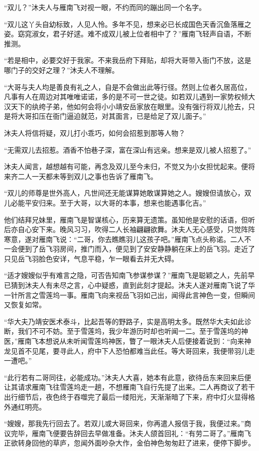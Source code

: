 “双儿？”沐夫人与雁南飞对视一眼，不约而同的蹦出同一个名字。

“双儿这丫头自幼标致，人见人怜。多年不见，想来必已长成国色天香沉鱼落雁之姿。窈窕淑女，君子好逑。难不成双儿被上位者相中了？”雁南飞轻声自语，不断推测。

“若是相中，必要交好于我家。不来我岳府下拜贴，却将大哥带入衙门不放，这是哪门子的交好之理？”沐夫人不理解。

“大哥与夫人均是善良有礼之人，自是不会做出此等行径。然则上位者久居高位，凡事有人在周边对其唯唯诺诺，多的是不可一世之徒。如若双儿遇到一家势权倾大汉天下的纨绔子弟，他如何会将小小靖安岳家放在眼里。没有强行将双儿抢去，只是将大哥扣压在衙门逼迫就范，对其面言，已是给足了双儿面子。”

沐夫人将信将疑，双儿打小乖巧，如何会招惹到那等人物？

“无需双儿去招惹。酒香不怕巷子深，富在深山有远亲。想来是双儿被人招惹了。”

沐夫人闻言，越想越有可能，再念及双儿至今未归，不觉又为小女担忧起来。便将来齐二人一天都未等到双儿之事也告诉了雁南飞。

“双儿的师尊是世外高人，凡世间还无能谋算她敢谋算她之人。嫂嫂但请放心，双儿必能平安归来。至于大哥，以大哥的本事，想来也能遇事化吉。”

他们结拜兄妹里，雁南飞是智谋核心，历来算无遗策。虽知他是安慰的话语，但听后亦自心安下来。晚风习习，吹得二人长袖翩翩欲舞。沐夫人无心感受，只觉阵阵寒意，遂对雁南飞说：“二哥，你去瞧瞧羽儿这孩子吧。”雁南飞点头称诺。二人不一会便到了岳飞羽房间，推门而入，便见到了安安静静躺在床上的岳飞羽。走近了只见岳飞羽脸色安详，气息平稳，乍一眼看去并无大碍。

“适才嫂嫂似乎有难言之隐，可否告知南飞参谋参谋？”雁南飞是聪颖之人，先前早已猜到沐夫人有未尽之言，心中疑惑，直到此刻才提起。沐夫人遂对雁南飞说了华一针所言之雪莲坞一事。雁南飞向来视岳飞羽如己出，闻得此言神色一变，但瞬间又恢复如常。

“华大夫乃靖安医术泰斗，比起吾等的野路子，实是高明太多。既然华大夫如此诊断，我们不可不妨。至于雪莲坞，我少年游历时却也听闻一二。至于雪莲坞的神医，”雁南飞本想说从未听闻雪莲坞神医，瞥了一眼沐夫人后便接着说到：“向来神龙见首不见尾，要寻此人，府中下人恐怕都难当此任。等大哥回来，我便带羽儿走一遭吧。”

“此行若有二哥同往，必能成功。”沐夫人大喜，她本有此意，欲待岳东来回来后便让其请求雁南飞往雪莲坞走一趟，不想雁南飞自行先提了出来。二人再商议了若干出行细节后，夜色终于吞噬完了最后一缕阳光，天渐渐暗了下来，府中灯火显得格外通红明亮。

“嫂嫂，那我先行回去了。若双儿或大哥回来，你再遣人报信于我，我便过来。”商议完毕，雁南飞便要告辞回去早做准备。沐夫人颌首回礼：“有劳二哥了。”雁南飞正欲转身回他的草庐，忽闻外面吵杂大作，金伯神色匆匆赶了进来，便停下脚步。

